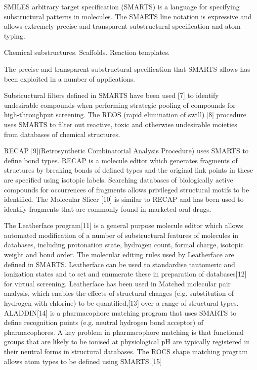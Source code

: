 SMILES arbitrary target specification (SMARTS) is a language for specifying substructural patterns in molecules. The SMARTS line notation is expressive and allows extremely precise and transparent substructural specification and atom typing. %



Chemical substructures. Scaffolds. Reaction templates.

The precise and transparent substructural specification that SMARTS allows has been exploited in a number of applications.

Substructural filters defined in SMARTS have been used [7] to identify undesirable compounds when performing strategic pooling of compounds for high-throughput screening. The REOS (rapid elimination of swill) [8] procedure uses SMARTS to filter out reactive, toxic and otherwise undesirable moieties from databases of chemical structures.

RECAP [9](Retrosynthetic Combinatorial Analysis Procedure) uses SMARTS to define bond types. RECAP is a molecule editor which generates fragments of structures by breaking bonds of defined types and the original link points in these are specified using isotopic labels. Searching databases of biologically active compounds for occurrences of fragments allows privileged structural motifs to be identified. The Molecular Slicer [10] is similar to RECAP and has been used to identify fragments that are commonly found in marketed oral drugs.

The Leatherface program[11] is a general purpose molecule editor which allows automated modification of a number of substructural features of molecules in databases, including protonation state, hydrogen count, formal charge, isotopic weight and bond order. The molecular editing rules used by Leatherface are defined in SMARTS. Leatherface can be used to standardise tautomeric and ionization states and to set and enumerate these in preparation of databases[12] for virtual screening. Leatherface has been used in Matched molecular pair analysis, which enables the effects of structural changes (e.g. substitution of hydrogen with chlorine) to be quantified,[13] over a range of structural types.
ALADDIN[14] is a pharmacophore matching program that uses SMARTS to define recognition points (e.g. neutral hydrogen bond acceptor) of pharmacophores. A key problem in pharmacophore matching is that functional groups that are likely to be ionised at physiological pH are typically registered in their neutral forms in structural databases. The ROCS shape matching program allows atom types to be defined using SMARTS.[15]

